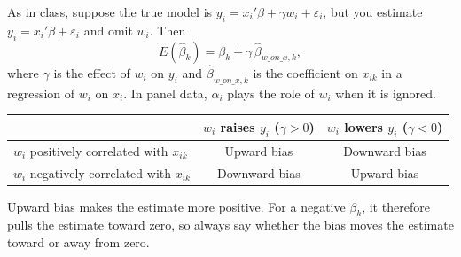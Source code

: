 \documentclass[12pt,a4paper]{article}
\begin{document}
As in class, suppose the true model is $y_i = x_i'\beta + \gamma w_i + \varepsilon_i$, but you estimate $y_i = x_i'\beta + \varepsilon_i$ and omit $w_i$. Then
\[
  E(\hat\beta_k) = \beta_k + \gamma \, \hat\beta_{w\_on\_x,k} ,
\]
where $\gamma$ is the effect of $w_i$ on $y_i$ and $\hat\beta_{w\_on\_x,k}$ is the coefficient on $x_{ik}$ in a regression of $w_i$ on $x_i$. In panel data, $\alpha_i$ plays the role of $w_i$ when it is ignored.
 
\begin{center}
\begin{tabular}{@{}lcc@{}}
\toprule
 & \textbf{$w_i$ raises $y_i$ ($\gamma > 0$)} & \textbf{$w_i$ lowers $y_i$ ($\gamma < 0$)} \\
\midrule
$w_i$ positively correlated with $x_{ik}$ & Upward bias & Downward bias \\
$w_i$ negatively correlated with $x_{ik}$ & Downward bias & Upward bias \\
\bottomrule
\end{tabular}
\end{center}
 
Upward bias makes the estimate more positive. For a negative $\beta_k$, it therefore pulls the estimate toward zero, so always say whether the bias moves the estimate toward or away from zero.
\end{document}
